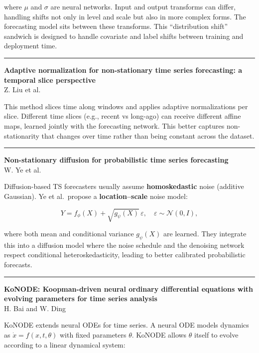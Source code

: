 \documentclass[a5paper]{article}
\begin{document}
where $\mu$ and $\sigma$ are neural networks. Input and output transforms can
differ, handling shifts not only in level and scale but also in more
complex forms. The forecasting model sits between these transforms. This
``distribution shift'' sandwich is designed to handle covariate and
label shifts between training and deployment time.

\begin{center}\rule{0.5\linewidth}{0.5pt}\end{center}

\textbf{Adaptive normalization for non-stationary time series
forecasting: a temporal slice perspective}\\
Z. Liu et al.

This method slices time along windows and applies adaptive
normalizations per slice. Different time slices (e.g., recent vs
long-ago) can receive different affine maps, learned jointly with the
forecasting network. This better captures non-stationarity that changes
over time rather than being constant across the dataset.

\begin{center}\rule{0.5\linewidth}{0.5pt}\end{center}

\textbf{Non-stationary diffusion for probabilistic time series
forecasting}\\
W. Ye et al.

Diffusion-based TS forecasters usually assume \textbf{homoskedastic}
noise (additive Gaussian). Ye et al.~propose a \textbf{location--scale}
noise model:

\[ Y = f_\phi(X) +
\sqrt{g_\psi(X)}\,\varepsilon,\quad \varepsilon\sim \mathcal{N}(0,I), \]

where both mean and conditional variance $g_\psi(X)$ are learned. They
integrate this into a diffusion model where the noise schedule and the
denoising network respect conditional heteroskedasticity, leading to
better calibrated probabilistic forecasts.

\begin{center}\rule{0.5\linewidth}{0.5pt}\end{center}

\textbf{KoNODE: Koopman-driven neural ordinary differential equations
with evolving parameters for time series analysis}\\
H. Bai and W. Ding

KoNODE extends neural ODEs for time series. A neural ODE models dynamics
as $\dot x = f(x,t,\theta)$ with fixed parameters $\theta$. KoNODE allows $\theta$
itself to evolve according to a linear dynamical system:
\end{document}
